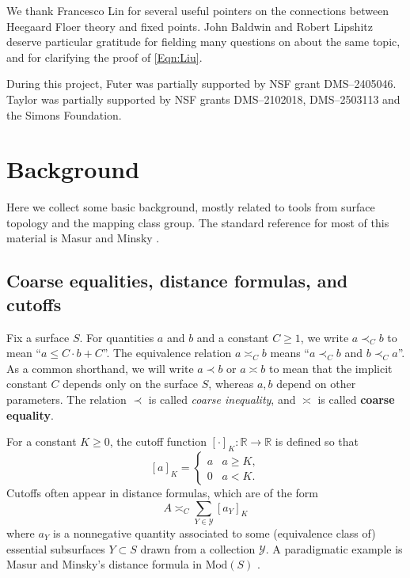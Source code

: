 \documentclass[11pt,letterpaper]{amsart}
\newcommand{\RR}[0]{\mathbb{R}}
\numberwithin{equation}{section}
\theoremstyle{definition}
\newcommand{\Mod}{\mathrm{Mod}}
\newcommand{\define}[1]{\textbf{#1}}
\newcommand{\from}{\colon} %
\begin{document}
We thank Francesco Lin for several useful pointers on the connections between Heegaard Floer theory and fixed points. John Baldwin and Robert Lipshitz deserve particular gratitude for fielding many questions on about the same topic, and for clarifying  the proof of \eqref{Eqn:Liu}. 

During this project,  Futer was partially supported by NSF grant DMS--2405046. Taylor was partially supported by NSF grants DMS--2102018, DMS--2503113 and the Simons Foundation.



\section{Background} \label{Sec:background} 
Here we collect some basic background, mostly related to tools from surface topology and the mapping class group. The standard reference for most of this material is Masur and Minsky \cite{MasurMinsky2}.

\subsection{Coarse equalities, distance formulas, and cutoffs}\label{Sec:Coarse} 
Fix a surface $S$.
For quantities $a$ and $b$ and a constant $C\ge1$, we write $a \prec_C b$ to mean ``$a \leq C \cdot b + C$''. The equivalence relation  $a \asymp_C b$ means ``$a \prec_C b$ and $b \prec_C a$''.
As a common shorthand, we will write $a \prec b$ or $a \asymp b$ to mean that the implicit constant $C$ depends only on the surface $S$, whereas $a,b$ depend on other parameters. The relation $\prec$ is called \emph{coarse inequality}, and $\asymp$ is called \define{coarse equality}.

For a constant $K \geq 0$, the cutoff function $[ \cdot ]_K \from \RR \to \RR$ is defined so that 
\[
[a]_K =
\begin{cases}
a & a \geq K, \\
0 & a < K.
\end{cases}
\]
Cutoffs often appear in distance formulas, which are of the form
\[
A \asymp_C \sum_{Y \in \mathcal Y} [a_Y]_K
\]
where $a_Y$ is a nonnegative quantity associated to some (equivalence class of) essential subsurfaces $Y \subset S$ drawn from a collection $\mathcal Y$. A paradigmatic example is Masur and Minsky's distance formula in $\Mod (S)$
\cite[Theorem 6.12]{MasurMinsky2}.
\end{document}
